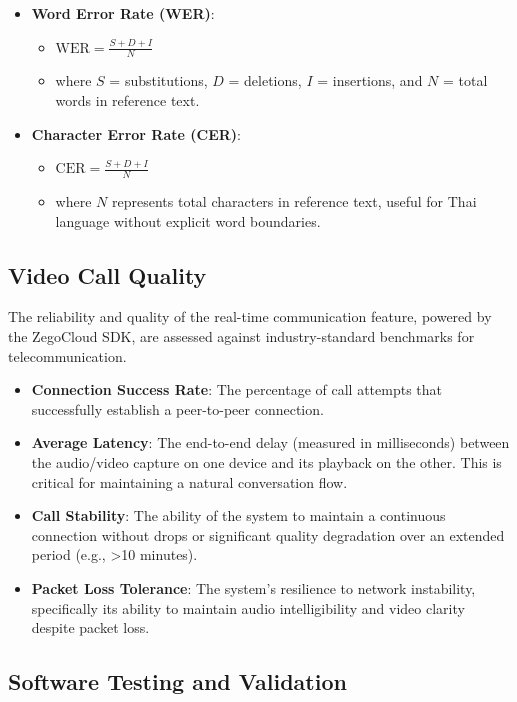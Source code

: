 \begin{itemize}
	\item \textbf{Word Error Rate (WER)}:
	\begin{itemize}
		\item $\text{WER} = \frac{S + D + I}{N}$
		\item where $S$ = substitutions, $D$ = deletions, $I$ = insertions, and $N$ = total words in reference text.
	\end{itemize}
	\item \textbf{Character Error Rate (CER)}:
	\begin{itemize}
		\item $\text{CER} = \frac{S + D + I}{N}$
		\item where $N$ represents total characters in reference text, useful for Thai language without explicit word boundaries.
	\end{itemize}
\end{itemize}


\subsection{Video Call Quality}

The reliability and quality of the real-time communication feature, powered by the ZegoCloud SDK, are assessed against industry-standard benchmarks for telecommunication.

\begin{itemize}
	\item \textbf{Connection Success Rate}: The percentage of call attempts that successfully establish a peer-to-peer connection.
	\item \textbf{Average Latency}: The end-to-end delay (measured in milliseconds) between the audio/video capture on one device and its playback on the other. This is critical for maintaining a natural conversation flow.
	\item \textbf{Call Stability}: The ability of the system to maintain a continuous connection without drops or significant quality degradation over an extended period (e.g., >10 minutes).
	\item \textbf{Packet Loss Tolerance}: The system's resilience to network instability, specifically its ability to maintain audio intelligibility and video clarity despite packet loss.
\end{itemize}

\subsection{Software Testing and Validation}

